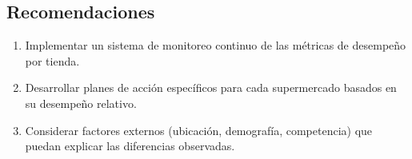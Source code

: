 \documentclass[11pt,a4paper]{article}
\begin{document}
\subsection{Recomendaciones}

\begin{enumerate}
    \item Implementar un sistema de monitoreo continuo de las métricas de desempeño por tienda.
    \item Desarrollar planes de acción específicos para cada supermercado basados en su desempeño relativo.
    \item Considerar factores externos (ubicación, demografía, competencia) que puedan explicar las diferencias observadas.
\end{enumerate}
\end{document}
